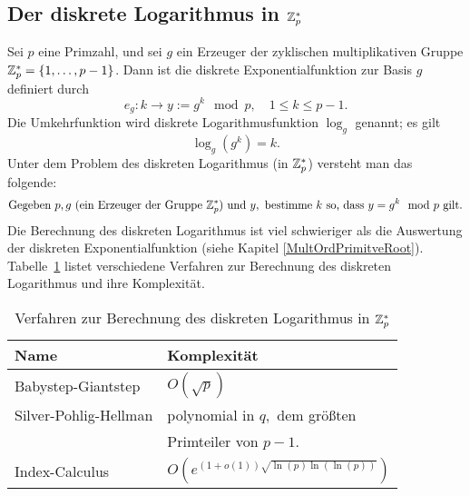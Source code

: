 \begin{refsegment}
\subsection{Der diskrete Logarithmus in \texorpdfstring{$ \mathbf{\mathbb{Z}}_p^* $}{Zp*}}
\label{L_Discrete_Logarithm}  %

Sei $ p $ eine Primzahl, und sei $g$ ein Erzeuger der zyklischen multiplikativen Gruppe $ \mathbf{\mathbb{Z}}_p^\ast=\{1,\ldots,p-1\} $. Dann ist die diskrete Exponentialfunktion zur Basis $ g $  definiert durch
\[ e_g : k \longrightarrow y:=g^k \mod p, \quad 1\leq k \leq p-1. \]
Die Umkehrfunktion wird diskrete Logarithmusfunktion $ \log_g $ genannt; es gilt
\[ \log_g (g^k) =k. \]
 Unter dem Problem des diskreten Logarithmus (in $ \mathbf{\mathbb{Z}}_p^\ast$) versteht man das folgende:
\[ \text{Gegeben } p,g \text{~(ein Erzeuger der Gruppe } \mathbf{\mathbb{Z}}_p^* \text{) und } y, \text{ bestimme } k \text{ so, dass } y=g^k \mod p \text{ gilt.}\]
Die Berechnung des diskreten Logarithmus ist viel schwieriger als die Auswertung der diskreten Exponentialfunktion (siehe Kapitel \ref{MultOrdPrimitveRoot}).
Tabelle~\ref{dlogprocs} listet verschiedene Verfahren zur Berechnung des diskreten
Logarithmus \cite{Stin2006} und ihre Komplexität.
\begin{table}[ht]
\begin{center}
\begin{tabular}{|l|l|}\hline
Name                 &        Komplexität\\ \hline \hline
Babystep-Giantstep   &         $ O(\sqrt{p}) $\\ \hline
Silver-Pohlig-Hellman &    polynomial in $ q, $ dem größten\\
&  Primteiler von $ p-1. $\\ \hline
Index-Calculus &             $ O(e^{(1+o(1)) \sqrt{\ln (p) \ln (\ln (p))}}) $\\ \hline
\end{tabular}
\end{center}
  
\caption{Verfahren zur Berechnung des diskreten Logarithmus in $ \mathbf{\mathbb{Z}}_p^\ast$}
\label{dlogprocs}
\end{table}



\end{refsegment}
